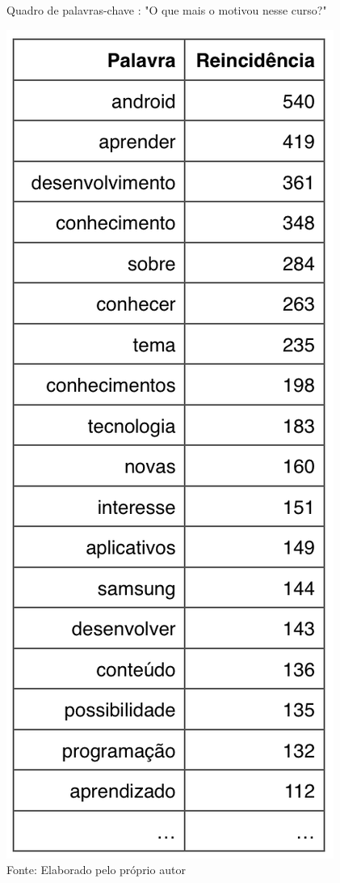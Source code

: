 \begin{figure}[H]
\caption{Quadro de palavras-chave : "O que mais o motivou nesse curso?"}
\centerline{\includegraphics[scale=0.75]{img/motivacaotopn}}
\label{fig:motivacaotopn}
\caption* {Fonte: Elaborado pelo próprio autor}
\end{figure}

